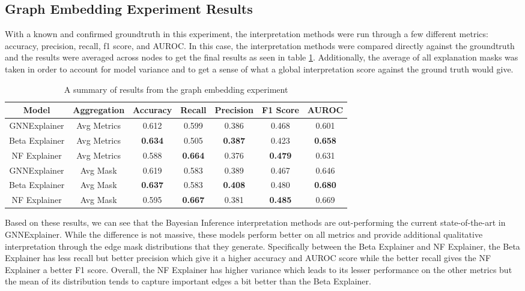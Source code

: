 \subsection{Graph Embedding Experiment Results}
With a known and confirmed groundtruth in this experiment, the interpretation methods were run through a few different metrics: accuracy, precision, recall, f1 score, and AUROC. In this case, the interpretation methods were compared directly against the groundtruth and the results were averaged across nodes to get the final results as seen in table \ref{tab:graph-embed-result}. Additionally, the average of all explanation masks was taken in order to account for model variance and to get a sense of what a global interpretation score against the ground truth would give.
\begin{table}[htb]
	\centering
	\begin{tabular}{|c|c||ccccc|}\hline
	Model & Aggregation & Accuracy & Recall & Precision & F1 Score & AUROC \\ \hline\hline
	GNNExplainer & Avg Metrics & 0.612 & 0.599 & 0.386 & 0.468 & 0.601 \\
	Beta Explainer & Avg Metrics & \textbf{0.634} & 0.505 & \textbf{0.387} & 0.423 & \textbf{0.658} \\
	NF Explainer & Avg Metrics & 0.588 & \textbf{0.664} & 0.376 & \textbf{0.479} & 0.631 \\ \hline
	GNNExplainer & Avg Mask & 0.619 & 0.583 & 0.389 & 0.467 & 0.646 \\
	Beta Explainer & Avg Mask & \textbf{0.637} & 0.583 & \textbf{0.408} & 0.480 & \textbf{0.680} \\
	NF Explainer & Avg Mask & 0.595 & \textbf{0.667} & 0.381 & \textbf{0.485} & 0.669 \\ \hline
	\end{tabular} 
	\caption{A summary of results from the graph embedding experiment}
	\label{tab:graph-embed-result}
\end{table}

Based on these results, we can see that the Bayesian Inference interpretation methods are out-performing the current state-of-the-art in GNNExplainer. While the difference is not massive, these models perform better on all metrics and provide additional qualitative interpretation through the edge mask distributions that they generate. Specifically between the Beta Explainer and NF Explainer, the Beta Explainer has less recall but better precision which give it a higher accuracy and AUROC score while the better recall gives the NF Explainer a better F1 score. Overall, the NF Explainer has higher variance which leads to its lesser performance on the other metrics but the mean of its distribution tends to capture important edges a bit better than the Beta Explainer.

